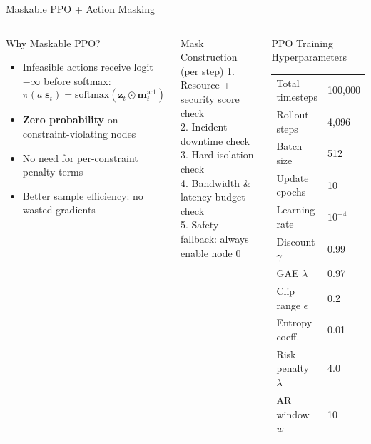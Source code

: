 \begin{frame}{Maskable PPO + Action Masking}
  \begin{columns}[T]
      \begin{block}{Why Maskable PPO?}
        \begin{itemize}
          \item Infeasible actions receive logit $-\infty$ before softmax:
          \[\pi(a|\mathbf{s}_t) = \text{softmax}(\mathbf{z}_t \odot \mathbf{m}_t^{\text{act}})\]
          \item \textbf{Zero probability} on constraint-violating nodes
          \item No need for per-constraint penalty terms
          \item Better sample efficiency: no wasted gradients
        \end{itemize}
      \end{block}
      \vspace{4pt}
      \begin{alertblock}{Mask Construction (per step)}
        \footnotesize
        1. Resource + security score check\\
        2. Incident downtime check\\
        3. Hard isolation check\\
        4. Bandwidth \& latency budget check\\
        5. Safety fallback: always enable node 0
      \end{alertblock}
      \begin{block}{PPO Training Hyperparameters}
        \footnotesize
        \begin{tabular}{ll}
          \toprule
          Total timesteps    & 100,000 \\
          Rollout steps      & 4,096 \\
          Batch size         & 512 \\
          Update epochs      & 10 \\
          Learning rate      & $10^{-4}$ \\
          Discount $\gamma$  & 0.99 \\
          GAE $\lambda$      & 0.97 \\
          Clip range $\epsilon$ & 0.2 \\
          Entropy coeff.     & 0.01 \\
          Risk penalty $\lambda$ & 4.0 \\
          AR window $w$      & 10 \\
          \bottomrule
        \end{tabular}
      \end{block}
  \end{columns}
\end{frame}

